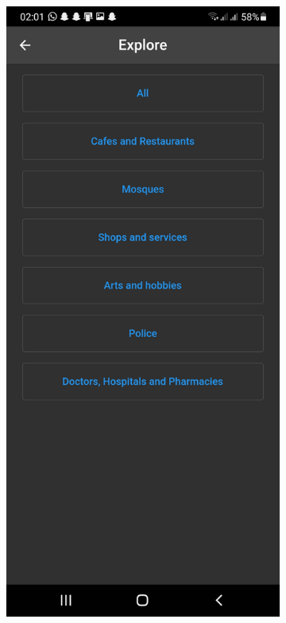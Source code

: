 \begin{figure}[!htbp]
    \centering
    \begin{subfigure}{.45\linewidth}
        \centering
         \includegraphics[width=\textwidth]{assets/app/explore/select type.jpg}

\end{subfigure}
\end{figure}
